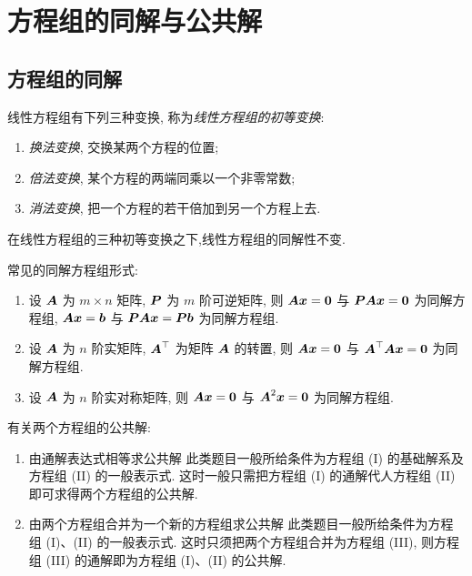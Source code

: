 \section{方程组的同解与公共解}

\subsection{方程组的同解}

\begin{definition}[线性方程组的同解性]
    线性方程组有下列三种变换, 称为\textit{线性方程组的初等变换}:
    \begin{enumerate}[label=(\arabic{*})]
        \item \textit{换法变换}, 交换某两个方程的位置;
        \item \textit{倍法变换}, 某个方程的两端同乘以一个非零常数;
        \item \textit{消法变换}, 把一个方程的若干倍加到另一个方程上去.
    \end{enumerate}
    在线性方程组的三种初等变换之下,线性方程组的同解性不变.
\end{definition}

常见的同解方程组形式:
\begin{enumerate}[label=(\arabic{*})]
    \item 设 $ \vb*{A} $ 为 $ m \times n $ 矩阵, $ \vb*{P} $ 为 $ m $ 阶可逆矩阵, 则 $ \vb*{A x}=\mathbf{0} $ 与 $ \vb*{P A x}=\mathbf{0} $ 为同解方程组, $ \vb*{A x}=\vb*{b} $ 与 $ \vb*{P A x}=\vb*{P b} $ 为同解方程组.
    \item 设 $ \vb*{A} $ 为 $ n $ 阶实矩阵, $ \vb*{A}^{\top} $ 为矩阵 $ \vb*{A} $ 的转置, 则 $ \vb*{A x}=\vb*{0} $ 与 $ \vb*{A}^{\top} \vb*{A x}=\vb*{0} $ 为同解方程组.
    \item 设 $ \vb*{A} $ 为 $ n $ 阶实对称矩阵, 则 $ \vb*{A x}=\vb*{0} $ 与 $ \vb*{A}^{2} \vb*{x}=\mathbf{0} $ 为同解方程组.
\end{enumerate}

有关两个方程组的公共解:
\begin{enumerate}[label=(\arabic{*})]
    \item 由通解表达式相等求公共解 此类题目一般所给条件为方程组 (I) 的基础解系及方程组 (II) 的一般表示式. 这时一般只需把方程组 (I) 的通解代人方程组 (II) 即可求得两个方程组的公共解.
    \item 由两个方程组合并为一个新的方程组求公共解 此类题目一般所给条件为方程组 (I)、(II) 的一般表示式. 这时只须把两个方程组合并为方程组 (III), 则方程组 (III) 的通解即为方程组 (I)、(II) 的公共解. 
\end{enumerate}

